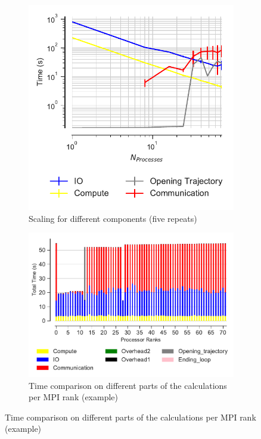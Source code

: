 \begin{figure}
\begin{subfigure}{.4\textwidth}
  \includegraphics[width=\linewidth]{figures/main-RMSD-time_comp_IO_comparison.pdf}
\caption{Scaling for different components (five repeats)}
\label{fig:ScalingComputeIO}
\end{subfigure}
\hfill
\begin{subfigure} {.5\textwidth}
  \includegraphics[width=\linewidth]{figures/main-RMSD-BarPlot-rank-comparison_72_5.pdf}
  \caption{Time comparison on different parts of the calculations per MPI rank (example)}
  \label{fig:MPIranks}
\end{subfigure}


\end{figure}
